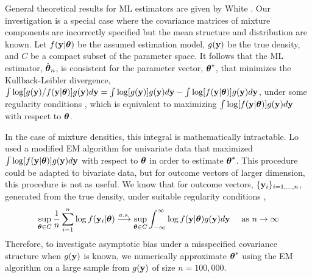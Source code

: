 General theoretical results for ML estimators are given by White \cite{white1982}. Our investigation is a special case where the covariance matrices of mixture components are incorrectly specified but the mean structure and distribution are known. Let $f(\mathbf y|\boldsymbol \theta)$ be the assumed estimation model, $g(\mathbf y)$ be the true density, and $C$ be a compact subset of the parameter space. It follows that the ML estimator, $\hat{\boldsymbol\theta}_{n}$, is consistent for the parameter vector, $\boldsymbol\theta^{*}$, that minimizes the Kullback-Leibler divergence, $\int \log[g(\mathbf y)/f(\mathbf y|\boldsymbol\theta)]g(\mathbf y)d\mathbf y=\int \log[g(\mathbf y)]g(\mathbf y)d\mathbf y-\int \log[f(\mathbf y|\boldsymbol\theta)]g(\mathbf y)d\mathbf y$, under some regularity conditions \cite{white1982}, which is equivalent to maximizing $\int \log[f(\mathbf y|\boldsymbol\theta)]g(\mathbf y)d\mathbf y$ with respect to $\boldsymbol\theta$.  

In the case of mixture densities, this integral is mathematically intractable. Lo \cite{lo2011} used a modified EM algorithm for univariate data that maximized $\int \log[f(\mathbf y|\boldsymbol\theta)]g(\mathbf y)d\mathbf y$  with respect to $\boldsymbol \theta$ in order to estimate $\boldsymbol\theta^{*}$. This procedure could be adapted to bivariate data, but for outcome vectors of larger dimension, this procedure is not as useful.  We know that for outcome vectors, $\{\mathbf y_i\}_{i=1,...,n}$, generated from the true density, under suitable regularity conditions \cite{jennrich1969},
$$\sup_{\boldsymbol \theta\in C}\frac{1}{n}\sum_{i=1}^{n} \log f(\mathbf y_{i}|\boldsymbol \theta)\overset{a.s.}{\longrightarrow} \sup_{\boldsymbol \theta\in C} \int^{\infty}_{-\infty} \log f(\mathbf y|\boldsymbol \theta)g(\mathbf y)d\mathbf y \quad \text{ as } n\rightarrow \infty$$
Therefore, to investigate asymptotic bias under a misspecified covariance structure when $g(\mathbf y)$ is known, we numerically approximate $\boldsymbol\theta^{*}$ using the EM algorithm on a large sample from $g(\mathbf y)$ of size $n=100,000$. 

